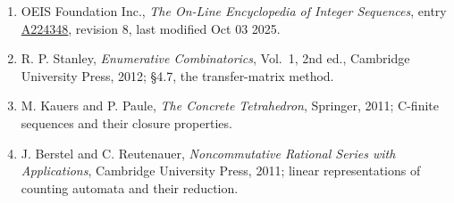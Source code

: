 \documentclass[11pt]{article}
\theoremstyle{definition}
\begin{document}
\begin{enumerate}

\item OEIS Foundation Inc., \emph{The On-Line Encyclopedia of Integer Sequences}, entry \href{https://oeis.org/A224348}{A224348}, revision 8, last modified Oct 03 2025.

\item R. P. Stanley, \emph{Enumerative Combinatorics}, Vol.~1, 2nd ed., Cambridge University Press, 2012; \S4.7, the transfer-matrix method.

\item M. Kauers and P. Paule, \emph{The Concrete Tetrahedron}, Springer, 2011; C-finite sequences and their closure properties.

\item J. Berstel and C. Reutenauer, \emph{Noncommutative Rational Series with Applications}, Cambridge University Press, 2011; linear representations of counting automata and their reduction.

\end{enumerate}
\end{document}
